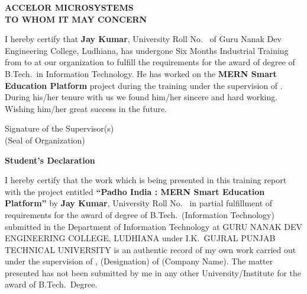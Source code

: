 \documentclass[12pt, a4paper, oneside]{report}
\begin{document}
\thispagestyle{fancy}
\begin{center}
{\fontsize{14}{17}\selectfont\bfseries ACCELOR MICROSYSTEMS}\\[1.5cm]
{\fontsize{14}{17}\selectfont\bfseries TO WHOM IT MAY CONCERN}
\thispagestyle{empty}
\end{center}

\vspace{0.8cm}

I hereby certify that \textbf{Jay Kumar}, University Roll No.\ \underline{\hspace{3cm}} of Guru Nanak Dev Engineering College, Ludhiana, has undergone Six Months Industrial Training from \underline{\hspace{3cm}} to \underline{\hspace{3cm}} at our organization to fulfill the requirements for the award of degree of B.Tech.\ in Information Technology. He has worked on the \textbf{MERN Smart Education Platform} project during the training under the supervision of \underline{\hspace{4cm}}. During his/her tenure with us we found him/her sincere and hard working. Wishing him/her great success in the future.

\vspace{3cm}

\begin{flushright}
Signature of the Supervisor(s)\\[0.5cm]
(Seal of Organization)
\end{flushright}

\newpage
\setcounter{page}{1}
\begin{center}
{\fontsize{16}{19}\selectfont\bfseries Student's Declaration}
\end{center}

\vspace{0.4cm}

I hereby certify that the work which is being presented in this training report with the project entitled \textbf{``Padho India : MERN Smart Education Platform''} by \textbf{Jay Kumar}, University Roll No.\ \underline{\hspace{3cm}} in partial fulfillment of requirements for the award of degree of B.Tech.\ (Information Technology) submitted in the Department of Information Technology at GURU NANAK DEV ENGINEERING COLLEGE, LUDHIANA under I.K.\ GUJRAL PUNJAB TECHNICAL UNIVERSITY is an authentic record of my own work carried out under the supervision of \underline{\hspace{4cm}}, \underline{\hspace{3.5cm}} (Designation) of \underline{\hspace{3.5cm}} (Company Name). The matter presented has not been submitted by me in any other University/Institute for the award of B.Tech.\ Degree.
\end{document}
